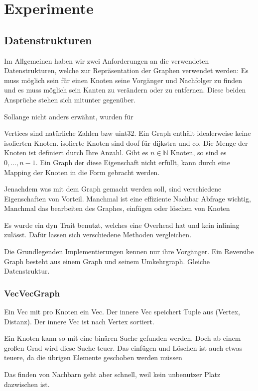 \chapter{Experimente}

\section{Datenstrukturen}

Im Allgemeinen haben wir zwei Anforderungen an die verwendeten Datenstrukturen, welche zur Repräsentation der Graphen verwendet werden: Es muss möglich sein für einen Knoten seine Vorgänger und Nachfolger zu finden und es muss möglich sein Kanten zu verändern oder zu entfernen.
Diese beiden Ansprüche stehen sich mitunter gegenüber.

Sollange nicht anders erwähnt, wurden für

Vertices sind natürliche Zahlen bzw uint32.
Ein Graph enthält idealerweise keine isolierten Knoten.
isolierte Knoten sind doof für dijkstra und co.
Die Menge der Knoten ist definiert durch Ihre Anzahl.
Gibt es $n \in \mathbb{N}$ Knoten, so sind es $0, \dotsc, n - 1$.
Ein Graph der diese Eigenschaft nicht erfüllt, kann durch eine Mapping der Knoten in die Form gebracht werden.

Jenachdem was mit dem Graph gemacht werden soll, sind verschiedene Eigenschaften von Vorteil.
Manchmal ist eine effiziente Nachbar Abfrage wichtig,
Manchmal das bearbeiten des Graphes, einfügen oder löschen von Knoten

Es wurde ein dyn Trait benutzt, welches eine Overhead hat und kein inlining zulässt.
Dafür lassen sich verschiedene Methoden vergleichen.

Die Grundlegenden Implementierungen kennen nur ihre Vorgänger.
Ein Reversibe Graph besteht aus einem Graph und seinem Umkehrgraph.
Gleiche Datenstruktur.

\subsection{VecVecGraph}
Ein Vec mit pro Knoten ein Vec.
Der innere Vec speichert Tuple aus (Vertex, Distanz).
Der innere Vec ist nach Vertex sortiert.

Ein Knoten kann so mit eine binären Suche gefunden werden.
Doch ab einem großen Grad wird diese Suche teuer.
Das einfügen und Löschen ist auch etwas teuere, da die übrigen Elemente geschoben werden müssen

Das finden von Nachbarn geht aber schnell, weil kein unbenutzer Platz dazwischen ist.

